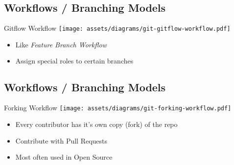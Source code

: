 \subsection{Workflows / Branching Models}
\begin{frame}[fragile]
  \subslidetitle
  Gitflow Workflow
  \center \texttt{[image: assets/diagrams/git-gitflow-workflow.pdf]}

  \begin{itemize}
    \item Like \textit{Feature Branch Workflow}
    \item Assign special roles to certain branches
  \end{itemize}

\end{frame}

\subsection{Workflows / Branching Models}
\begin{frame}[fragile]
  \subslidetitle
  Forking Workflow
  \center \texttt{[image: assets/diagrams/git-forking-workflow.pdf]}

  \vspace{2em}
  \begin{itemize}
    \item Every contributor has it's own copy (fork) of the repo
    \item Contribute with Pull Requests
    \item Most often used in Open Source
  \end{itemize}

\end{frame}
